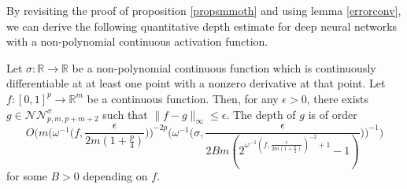\documentclass[anon,12pt]{colt2021} %
\begin{document}
By revisiting the proof of proposition \ref{propsmmoth} and using lemma \ref{errorconv}, we can derive the following quantitative depth estimate for deep neural networks with a non-polynomial continuous activation function.

\begin{proposition} \label{propcontinuous}
Let $\sigma : \mathbb{R} \rightarrow \mathbb{R}$ be a non-polynomial continuous function which is continuously differentiable at at least one point with a nonzero derivative at that point. Let $f: [0,1]^{p} \rightarrow \mathbb{R}^{m}$ be a continuous function. Then, for any $\epsilon > 0$, there exists $g \in \mathcal{NN}_{p,m,p+m+2}^{\sigma}$ such that $\| f - g \|_{\infty} \leq \epsilon$. The depth of $g$ is of order
\begin{equation}
        O \bigg( m \bigg(\omega^{-1} \big(f, \frac{\epsilon}{2m(1+\frac{p}{4})} \big) \bigg)^{-2p} \bigg( \omega^{-1} \big( \sigma, \frac{\epsilon}{2Bm(2^{\omega^{-1}(f, \frac{\epsilon}{2m(1+\frac{p}{4})})^{-2}+1} -1)} \big) \bigg)^{-1}\bigg)
    \end{equation}
for some $B > 0$ depending on $f$.
\end{proposition}
\end{document}
